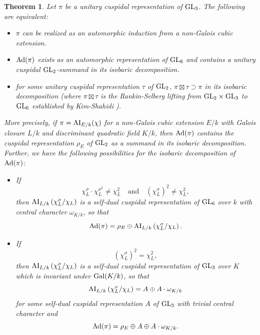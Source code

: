 \documentclass[11pt]{amsart}
\theoremstyle{plain}
\newtheorem{thm}[equation]{Theorem}
\numberwithin{equation}{section}
\def\GL{{\rm GL}}
\begin{document}
\begin{thm} \label{T:AI2}
Let $\pi$ be a unitary cuspidal representation of $\GL_3$.  The following are equivalent:
\vskip 5pt

\begin{itemize}
\item[(i)] $\pi$ can be realized as an automorphic induction from a non-Galois cubic extension.
\vskip 5pt

\item[(ii)]  ${\rm Ad}(\pi)$ exists as an automorphic representation of $\GL_8$ and contains a unitary cuspidal $\GL_2$-summand in its isobaric  decomposition. 
\vskip 5pt

\item[(iii)]  for some unitary cuspidal representation $\tau$ of $\GL_2$, $\pi \boxtimes \tau  \supset \pi$ in its isobaric decomposition (where $\pi \boxtimes \tau$ is the Rankin-Selberg lifting from $\GL_2 \times \GL_3$ to $\GL_6$ established by Kim-Shahidi \cite{KS1}). 
\end{itemize}
\vskip 10pt

More precisely, if $\pi ={\rm AI}_{E/k}(\chi)$ for a non-Galois cubic extension $E/k$ with Galois closure $L/k$ and discriminant quadratic field $K/k$, then ${\rm Ad}(\pi)$ contains the cuspidal representation $\rho_E$ of $\GL_2$   as a summand in its isobaric decomposition.  Further, we have the following possibilities for the isobaric decomposition of ${\rm Ad}(\pi)$:
\vskip 5pt

\begin{itemize}
\item[(a)]  If 
\[ \chi_L^{\sigma} \cdot \chi_L^{\sigma^2}  \ne  \chi_L^2 \quad \text{and} \quad   (\chi_L^{\sigma})^2 \ne \chi_L^2, \]
 then ${\rm AI}_{L/k}\left( \chi_L^{\sigma}/ \chi_L \right)$ is a self-dual cuspidal representation of $\GL_6$ over $k$ with central character $\omega_{K/k}$, so that
 \[ {\rm Ad}(\pi) = \rho_E \oplus   {\rm AI}_{L/k}\left( \chi_L^{\sigma}/ \chi_L \right). \]
 
\vskip 5pt

\item[(b)]  If 
\[  (\chi_L^{\sigma})^2 = \chi_L^2, \]
 then  ${\rm AI}_{L/k}\left( \chi_L^{\sigma}/ \chi_L \right)$ 
 is a self-dual cuspidal representation of $\GL_3$ over $K$ which is invariant under ${\rm Gal}(K/k)$, so that 
\[  {\rm AI}_{L/k}\left( \chi_L^{\sigma}/ \chi_L \right) = A \oplus A  \cdot \omega_{K/k} \]
for some self-dual cuspidal representation $A$ of $\GL_3$ with trivial central character and
\[ {\rm Ad}(\pi) = \rho_E \oplus  A \oplus A \cdot \omega_{K/k}. \]


\end{itemize}
\end{thm}
\end{document}
